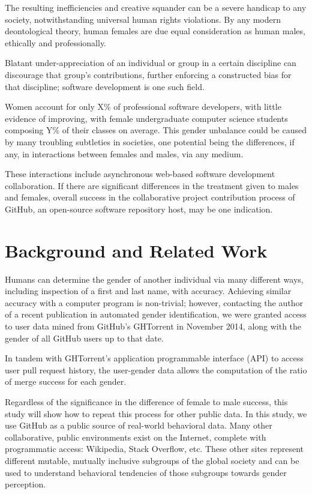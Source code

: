 \documentclass{sigplanconf}
\begin{document}
The resulting inefficiencies and creative
squander can be a severe handicap to any society, notwithstanding universal human rights
violations. By any modern deontological theory, human females are due equal
consideration as human males, ethically and professionally.

Blatant under-appreciation of an individual or group in a certain
discipline can discourage that group's contributions, further enforcing a
constructed bias for that discipline; software development is one such
field.

Women account for only X\% of professional software developers, with little
evidence of improving, with female undergraduate computer science students composing Y\% of
their classes on average. This gender unbalance could be caused by many troubling subtleties
in societies, one potential being the differences, if any, in interactions
between females and males, via any medium.

These interactions include asynchronous web-based software development
collaboration. If there are significant differences in the treatment given to males
and females, overall success in the collaborative project contribution process
of GitHub, an open-source software repository host, may be one indication.

\section{Background and Related Work}
Humans can determine the gender of another individual via many different
ways, including inspection of a first and last name, with accuracy. Achieving
similar accuracy with a computer program is non-trivial; however, contacting the
author of a recent publication in automated gender identification, we were
granted access to user data mined from GitHub's GHTorrent in November 2014,
along with the gender of all GitHub users up to that date.

In tandem with GHTorrent's application programmable interface (API) to
access user pull request history, the user-gender data allows the computation of
the ratio of merge success for each gender.

Regardless of the significance in the difference of female to male success, this study will 
show how to repeat this process for other public data. In this study, we use GitHub as a public source of real-world behavioral data.
Many other collaborative, public environments exist on the Internet, complete
with programmatic access: Wikipedia, Stack Overflow, etc. These other sites
represent different mutable, mutually inclusive subgroups of the global
society and can be used to understand behavioral tendencies of those subgroups
towards gender perception.
\end{document}
